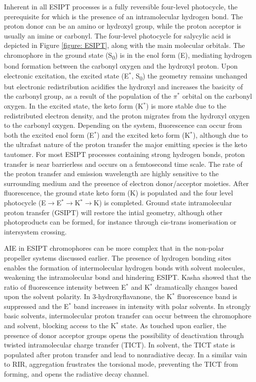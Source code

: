 Inherent in all ESIPT processes is a fully reversible four-level photocycle, the prerequisite for which is the presence of an intramolecular hydrogen bond. The proton donor can be an amino or hydroxyl group, while the proton acceptor is usually an imine or carbonyl. The four-level photocycle for salycylic acid is depicted in Figure \ref{figure: ESIPT}, along with the main molecular orbitals. The chromophore in the ground state (S\textsubscript{0}) is in the enol form (E), mediating hydrogen bond formation between the carbonyl oxygen and the hydroxyl proton. Upon electronic excitation, the excited state (E$^\ast$, S\textsubscript{0}) the geometry remains unchanged but electronic redistribution acidifies the hydroxyl and increases the basicity of the carbonyl group, as a result of the population of the $\pi^\ast$ orbital on the carbonyl oxygen. In the excited state, the keto form (K$^\ast$) is more stable due to the redistributed electron density, and the proton migrates from the hydroxyl oxygen to the carbonyl oxygen. Depending on the system, fluorescence can occur from both the excited enol form (E$^\ast$) and the excited keto form (K$^\ast$), although due to the ultrafast nature of the proton transfer the major emitting species is the keto tautomer.\cite{Zhao2012} For most ESIPT processes containing strong hydrogen bonds, proton transfer is near barrierless and  occurs on a femtosecond time scale.\cite{Padalkar2015} The rate of the proton transfer and emission wavelength are highly sensitive to the surrounding medium and the presence of electron donor/acceptor moieties.\cite{Demchenko2013,Lin2017a,Li2017c} After fluorescence, the ground state keto form (K) is populated and the four level photocycle (E$\rightarrow$E$^{\ast}$$\rightarrow$K$^{\ast}$$\rightarrow$K) is completed. Ground state intramolecular proton transfer (GSIPT) will restore the intial geometry, although other photoproducts can be formed, for instance through cis-trans isomerisation or intersystem crossing.\cite{Al-Soufi1990}

AIE in ESIPT chromophores can be more complex that in the non-polar propeller systems discussed earlier. The presence of hydrogen bonding sites enables the formation of intermolecular hydrogen bonds with solvent molecules, weakening the intramolecular bond and hindering ESIPT.\cite{Cheng2015f} Kasha showed that the ratio of fluorescence intensity between E$^\ast$ and K$^\ast$ dramatically changes based upon the solvent polarity.\cite{Kasha1986} In 3-hydroxyflavanone, the K$^\ast$ fluorescence band is suppressed and the E$^\ast$ band increases in intensity with polar solvents. In strongly basic solvents, intermolecular proton transfer can occur between the chromophore and solvent, blocking access to the K$^\ast$ state\cite{Laurent2014}. As touched upon earlier, the presence of donor acceptor groups opens the possibility of deactivation through twisted intramolecular charge transfer (TICT). In solvent, the TICT state is populated after proton transfer and lead to nonradiative decay. In a similar vain to RIR, aggregation frustrates the torsional mode, preventing the TICT from forming, and opens the radiative decay channel.\cite{Park2017,Wu2015a}

